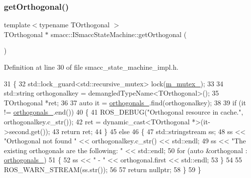 \subsubsection{\texorpdfstring{get\+Orthogonal()}{getOrthogonal()}}
{\footnotesize\ttfamily template$<$typename T\+Orthogonal $>$ \\
T\+Orthogonal $\ast$ smacc\+::\+I\+Smacc\+State\+Machine\+::get\+Orthogonal (\begin{DoxyParamCaption}{ }\end{DoxyParamCaption})}



Definition at line 30 of file smacc\+\_\+state\+\_\+machine\+\_\+impl.\+h.


\begin{DoxyCode}
31 \{
32   std::lock\_guard<std::recursive\_mutex> lock(\hyperlink{classsmacc_1_1ISmaccStateMachine_aac785541646e5c517273bf31072505a1}{m\_mutex\_});
33 
34   std::string orthogonalkey = demangledTypeName<TOrthogonal>();
35   TOrthogonal *ret;
36 
37   \textcolor{keyword}{auto} it = \hyperlink{classsmacc_1_1ISmaccStateMachine_acc5944f313bc6ce1637c632243a511f2}{orthogonals\_}.find(orthogonalkey);
38 
39   \textcolor{keywordflow}{if} (it != \hyperlink{classsmacc_1_1ISmaccStateMachine_acc5944f313bc6ce1637c632243a511f2}{orthogonals\_}.end())
40   \{
41     ROS\_DEBUG(\textcolor{stringliteral}{"Orthogonal %
       resource in cache."}, orthogonalkey.c\_str());
42     ret = \textcolor{keyword}{dynamic\_cast<}TOrthogonal *\textcolor{keyword}{>}(it->second.get());
43     \textcolor{keywordflow}{return} ret;
44   \}
45   \textcolor{keywordflow}{else}
46   \{
47     std::stringstream ss;
48     ss << \textcolor{stringliteral}{"Orthogonal not found "} << orthogonalkey.c\_str() << std::endl;
49     ss << \textcolor{stringliteral}{"The existing orthogonals are the following: "} << std::endl;
50     \textcolor{keywordflow}{for} (\textcolor{keyword}{auto} &orthogonal : \hyperlink{classsmacc_1_1ISmaccStateMachine_acc5944f313bc6ce1637c632243a511f2}{orthogonals\_})
51     \{
52       ss << \textcolor{stringliteral}{" - "} << orthogonal.first << std::endl;
53     \}
54 
55     ROS\_WARN\_STREAM(ss.str());
56 
57     \textcolor{keywordflow}{return} \textcolor{keyword}{nullptr};
58   \}
59 \}
\end{DoxyCode}
\mbox{\label{classsmacc_1_1ISmaccStateMachine_a7f5b2882dbd077584767cb2533ed3c49}} 
